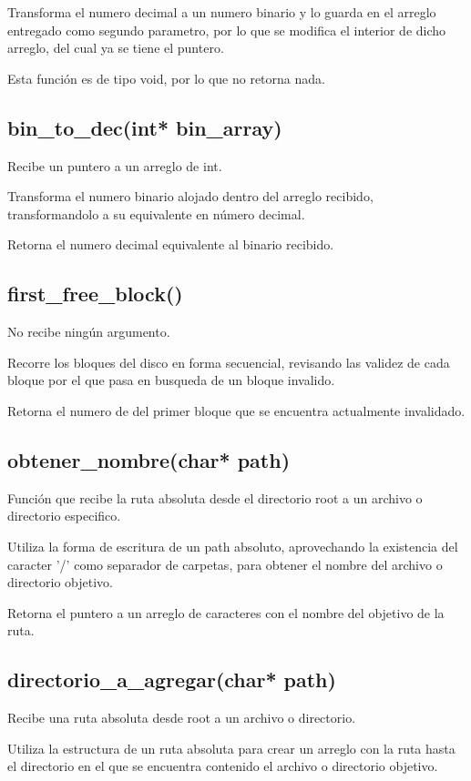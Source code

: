 \documentclass[12pt]{article}
\begin{document}
Transforma el numero decimal a un numero binario y lo guarda en el arreglo entregado como segundo parametro, por lo que se modifica el interior de dicho arreglo, del cual ya se tiene el puntero.

Esta función es de tipo void, por lo que no retorna nada.

\subsection{bin\_to\_dec(int* bin\_array)}
Recibe un puntero a un arreglo de int.

Transforma el numero binario alojado dentro del arreglo recibido, transformandolo a su equivalente en número decimal.

Retorna el numero decimal equivalente al binario recibido.

\subsection{first\_free\_block()}
No recibe ningún argumento.

Recorre los bloques del disco en forma secuencial, revisando las validez de cada bloque por el que pasa en busqueda de un bloque invalido.

Retorna el numero de del primer bloque que se encuentra actualmente invalidado.

\subsection{obtener\_nombre(char* path)}
Función que recibe la ruta absoluta desde el directorio root a un archivo o directorio especifico.

Utiliza la forma de escritura de un path absoluto, aprovechando la existencia del caracter '/' como separador de carpetas, para obtener el nombre del archivo o directorio objetivo.

Retorna el puntero a un arreglo de caracteres con el nombre del objetivo de la ruta.

\subsection{directorio\_a\_agregar(char* path)}
Recibe una ruta absoluta desde root a un archivo o directorio.

Utiliza la estructura de un ruta absoluta para crear un arreglo con la ruta hasta el directorio en el que se encuentra contenido el archivo o directorio objetivo.
\end{document}
